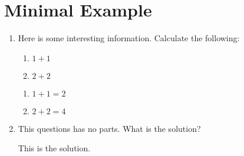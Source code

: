 \documentclass{article}
\begin{document}
\newenvironment{SomeSolutionDividerName}{}{}

\section*{Minimal Example}

\hrulefill

\medskip

\begin{enumerate}

    \item Here is some interesting information. Calculate the following:

          \begin{enumerate}
              \item $1+1$
              \item $2+2$
          \end{enumerate}

          \begin{SomeSolutionDividerName}
              \begin{enumerate}
                  \item $1+1=2$
                  \item $2+2=4$
              \end{enumerate}
          \end{SomeSolutionDividerName}

    \item This questions has no parts. What is the solution?

          \begin{SomeSolutionDividerName}
              This is the solution.
          \end{SomeSolutionDividerName}

\end{enumerate}
\end{document}
